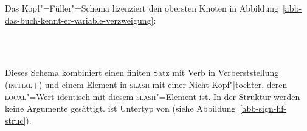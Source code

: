 Das Kopf"=Füller"=Schema lizenziert den obersten Knoten in Abbildung~\ref{abb-das-buch-kennt-er-variable-verzweigung}:
\begin{schema}[Kopf"=Füller"=Schema]
\label{hf-schemaa}
~\\\samepage
{} \impl\\
\end{schema}
Dieses Schema kombiniert einen finiten Satz mit Verb in Verberststellung (\textsc{initial}+) und einem Element in \textsc{slash}
mit einer Nicht-Kopf"|tochter, deren \textsc{local}"=Wert identisch mit diesem \textsc{slash}"=Element ist.
In der Struktur werden keine Argumente gesättigt.  ist Untertyp von 
(siehe Abbildung~\vref{abb-sign-hf-struc}).
